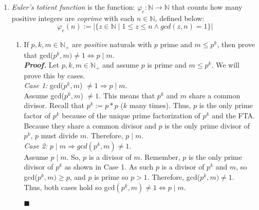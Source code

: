 \documentclass[11pt,a4paper]{article}
\begin{document}
\begin{enumerate}
    \item 
    \emph{Euler's totient function} is the function: $\varphi_e: \mathbb{N} \rightarrow \mathbb{N} $
    that counts how many positive integers are \emph{coprime} with each $n \in \mathbb{N} $, defined below:
    \begin{equation*}
        \varphi_e (n) := |\{z \in \mathbb{N} \mid 1 \leq z \leq n \land gcd(z, n) = 1 \} |
    \end{equation*}
    \begin{enumerate}
        \item 
        If $p, k, m \in \mathbb{N}_+ $ are \emph{positive} naturals with $p$ prime and $m \leq p^k  $,
        then prove that gcd($p^k, m ) \neq 1 \Leftrightarrow p \mid m $. \\
        \emph{\textbf{Proof.}} Let $p, k, m \in \mathbb{N}_+ $ and assume $p$ is prime and $m \leq p^k $. We will prove this by cases. \\
        \emph{Case 1:} gcd($p^k, m $) $\neq 1 \Rightarrow p \mid m$. \\
        Assume gcd($p^k, m $) $\neq 1 $. This means that $p^k$ and $m$ share a common divisor. Recall that $p^k := p * p$ ($k$ many times). Thus, $p$ is the only prime factor of $p^k$ because of the unique prime factorization of $p^k$ and the FTA.
        Because they share a common divisor and $p$ is the only prime divisor of $p^k$, $p$ must divide $m$. Therefore, $p \mid m $. \\
        \emph{Case 2:} $p \mid m \Rightarrow gcd(p^k, m) \neq 1 $. \\
        Assume $p \mid m $. So, $p $ is a divisor of $m$. 
        Remember, $p$ is the only prime divisor of $p^k$ as shown in Case 1. As such $p$ is a divisor of $p^k$ and $m$, so gcd($p^k, m ) \geq p$, and $p$ is prime so $p > 1$. 
        Therefore, gcd($p^k, m ) \neq 1$. \\
        Thus, both cases hold so gcd$(p^k, m) \neq 1 \Leftrightarrow  p \mid m$. 
        \begin{flushright}
            $\blacksquare$
        \end{flushright}


\end{enumerate}
\end{enumerate}
\end{document}
